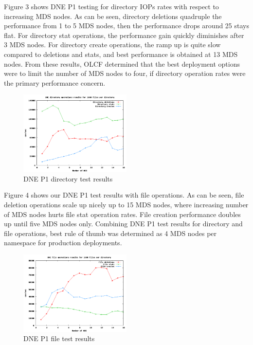 \documentclass[conference,compsoc]{IEEEtran}
\begin{document}
Figure 3 shows DNE P1 testing for directory IOPs rates with respect to
increasing MDS nodes. As can be seen, directory deletions quadruple the
performance from 1 to 5 MDS nodes, then the performance drops around 25%
stays flat. For directory stat operations, the performance gain quickly
diminishes after 3 MDS nodes. For directory create operations, the ramp up is
quite slow compared to deletions and stats, and best performance is obtained at
13 MDS nodes. From these results, OLCF determined that the best deployment
options were to limit the number of MDS nodes to four, if directory operation
rates were the primary performance concern.


\begin{figure}[!ht]
  \centering
    \includegraphics[width=0.5\textwidth]{figs/dnep1_dir_results}
  \caption{DNE P1 directory test results}
\end{figure}


Figure 4 shows our DNE P1 test results with file operations. As can be seen,
file deletion operations scale up nicely up to 15 MDS nodes, where increasing
number of MDS nodes hurts file stat operation rates. File creation performance
doubles up until five MDS nodes only.  Combining DNE P1 test results for
directory and file operations, best rule of thumb was determined as 4 MDS nodes
per namespace for production deployments.


\begin{figure}[!ht]
  \centering
    \includegraphics[width=0.5\textwidth]{figs/dnep1_file_results}
  \caption{DNE P1 file test results}
\end{figure}
 
\end{document}
